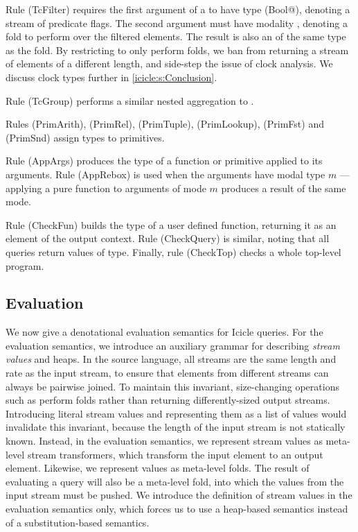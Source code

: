 Rule (TcFilter) requires the first argument of a \Ic@filter@ to have type (\Ic@Element Bool@), denoting a stream of predicate flags.
The second argument must have modality \Ic@Aggregate@, denoting a fold to perform over the filtered elements.
The result is also an \Ic@Aggregate@ of the same type as the fold.
By restricting \Ic@filter@ to only perform folds, we ban \Ic@filter@ from returning a stream of elements of a different length, and side-step the issue of clock analysis.
We discuss clock types further in \cref{icicle:s:Conclusion}.

Rule (TcGroup) performs a similar nested aggregation to \Ic@filter@.

Rules (PrimArith), (PrimRel), (PrimTuple), (PrimLookup), (PrimFst) and (PrimSnd) assign types to primitives.

Rule (AppArgs) produces the type of a function or primitive applied to its arguments.
Rule (AppRebox) is used when the arguments have modal type $m$ --- applying a pure function to arguments of mode $m$ produces a result of the same mode.

Rule (CheckFun) builds the type of a user defined function, returning it as an element of the output context.
Rule (CheckQuery) is similar, noting that all queries return values of \Ic@Aggregate@ type.
Finally, rule (CheckTop) checks a whole top-level program.


\subsection{Evaluation}

We now give a denotational evaluation semantics for Icicle queries.
For the evaluation semantics, we introduce an auxiliary grammar for describing \emph{stream values} and heaps.
In the source language, all streams are the same length and rate as the input stream, to ensure that elements from different streams can always be pairwise joined.
To maintain this invariant, size-changing operations such as \Ic@filter@ perform folds rather than returning differently-sized output streams.
Introducing literal stream values and representing them as a list of values would invalidate this invariant, because the length of the input stream is not statically known.
Instead, in the evaluation semantics, we represent \Ic@Element@ stream values as meta-level stream transformers, which transform the input element to an output element.
Likewise, we represent \Ic@Aggregate@ values as meta-level folds.
The result of evaluating a query will also be a meta-level fold, into which the values from the input stream must be pushed.
We introduce the definition of stream values in the evaluation semantics only, which forces us to use a heap-based semantics instead of a substitution-based semantics.

